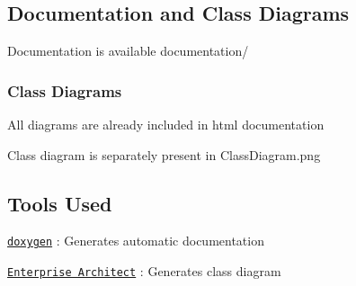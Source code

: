 \subsection*{Documentation and Class Diagrams}


\begin{DoxyItemize}
\item Documentation is available {\ttfamily documentation/}
\end{DoxyItemize}

\subsubsection*{Class Diagrams}


\begin{DoxyItemize}
\item All diagrams are already included in html documentation
\item Class diagram is separately present in {\ttfamily Class\+Diagram.\+png}
\end{DoxyItemize}

\subsection*{Tools Used}


\begin{DoxyItemize}
\item \href{http://www.stack.nl/~dimitri/doxygen/}{\tt doxygen} \+: Generates automatic documentation
\item \href{http://www.sparxsystems.com/products/ea/}{\tt Enterprise Architect} \+: Generates class diagram 
\end{DoxyItemize}